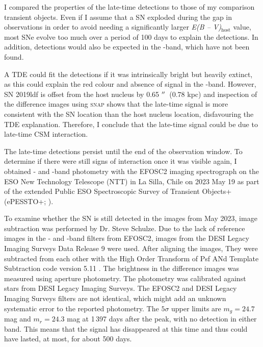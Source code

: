 \documentclass[a4paper,oneside,12pt, class=Latex/Classes/PhDthesisPSnPDF, crop=false]{standalone}
\begin{document}
I compared the properties of the late-time detections to those of my comparison transient objects. Even if I assume that a SN exploded during the gap in observations in order to avoid needing a significantly larger \textit{E(B -- V)}$_\text{host}$ value, most SNe evolve too much over a period of 100 days to explain the detections. In addition, detections would also be expected in the \ztfg-band, which have not been found.

A TDE could fit the detections if it was intrinsically bright but heavily extinct, as this could explain the red colour and absence of signal in the \ztfg-band. However, SN 2019ldf is offset from the host nucleus by 0.65 $^{\prime\prime}$~(0.78 kpc) and inspection of the difference images using \textsc{snap} shows that the late-time signal is more consistent with the SN location than the host nucleus location, disfavouring the TDE explanation. Therefore, I conclude that the late-time signal could be due to late-time CSM interaction.

The late-time detections persist until the end of the observation window. To determine if there were still signs of interaction once it was visible again, I obtained \ztfg- and \ztfr-band photometry with the EFOSC2 imaging spectrograph \citep{EFOSC2} on the ESO New Technology Telescope (NTT) in La Silla, Chile on 2023 May 19 as part of the extended Public ESO Spectroscopic Survey of Transient Objects+ (ePESSTO+; \citealt{PESSTO}).

To examine whether the SN is still detected in the images from May 2023, image subtraction was performed by Dr. Steve Schulze. Due to the lack of reference images in the \ztfg- and \ztfr-band filters from EFOSC2, images from the DESI Legacy Imaging Surveys Data Release 9 \citep{DESI-Legacy_Imaging_Surveys} were used. After aligning the images, They were subtracted from each other with the High Order Transform of Psf ANd Template Subtraction code version 5.11 \citep[\textsc{hotpants};][]{HOTPANTS}. The brightness in the difference images was measured using aperture photometry. The photometry was calibrated against stars from DESI Legacy Imaging Surveys. The EFOSC2 and DESI Legacy Imaging Surveys filters are not identical, which might add an unknown systematic error to the reported photometry. The $5\sigma$ upper limits are $m_g = 24.7$ mag and $m_r = 24.3$ mag at 1\,397 days after the peak, with no detection in either band. This means that the signal has disappeared at this time and thus could have lasted, at most, for about 500 days.
\end{document}
